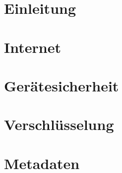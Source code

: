 \section{Einleitung}
\subsection{}


\section{Internet}
\subsection{}


\section{Gerätesicherheit}
\subsection{}


\section{Verschlüsselung}
\subsection{}


\section{Metadaten}
\subsection{}

